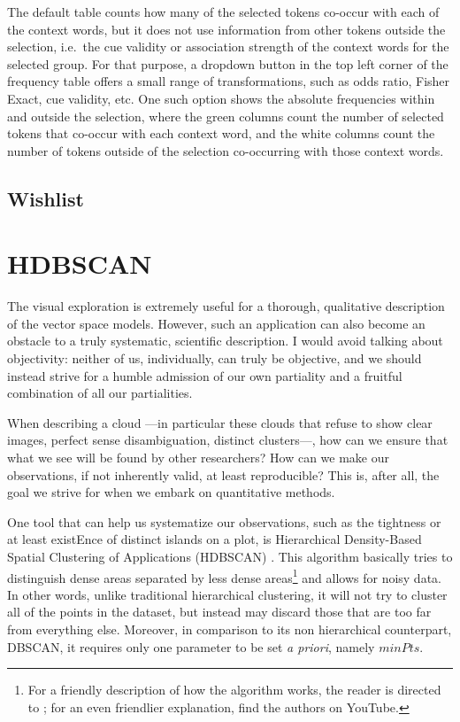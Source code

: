 \documentclass[
]{book}
\begin{document}
The default table counts how many of the selected tokens co-occur with each of the context words, but it does not use information from other tokens outside the selection, i.e.~the cue validity or association strength of the context words for the selected group. For that purpose, a dropdown button in the top left corner of the frequency table offers a small range of transformations, such as odds ratio, Fisher Exact, cue validity, etc. One such option shows the absolute frequencies within and outside the selection, where the green columns count the number of selected tokens that co-occur with each context word, and the white columns count the number of tokens outside of the selection co-occurring with those context words.

\hypertarget{wishlist}{%
\section{Wishlist}\label{wishlist}}

\hypertarget{hdbscan}{%
\chapter{HDBSCAN}\label{hdbscan}}

The visual exploration is extremely useful for a thorough, qualitative description
of the vector space models. However, such an application can also become an obstacle
to a truly systematic, scientific description. I would avoid talking about objectivity:
neither of us, individually, can truly be objective, and we should instead strive for a
humble admission of our own partiality and a fruitful combination of all our partialities.

When describing a cloud ---in particular these clouds that refuse to show clear images,
perfect sense disambiguation, distinct clusters---, how can we ensure that what we
see will be found by other researchers? How can we make our observations, if not
inherently valid, at least reproducible?
This is, after all, the goal we strive for when we embark on quantitative methods.

One tool that can help us systematize our observations, such as the tightness or at least
existEnce of distinct islands on a plot, is
Hierarchical Density-Based Spatial Clustering of Applications (HDBSCAN) \autocite{campello.etal_2013}.
This algorithm basically tries to distinguish dense areas separated by less dense areas\footnote{For a friendly description of how the algorithm works, the reader is directed to \textcite{mcinnes.etal_2016}; for an even friendlier explanation, find the authors on YouTube.}
and allows for noisy data. In other words, unlike traditional hierarchical clustering,
it will not try to cluster all of the points in the dataset, but instead may discard those
that are too far from everything else. Moreover, in comparison to its non hierarchical counterpart,
DBSCAN,
it requires only one parameter to be set \emph{a priori}, namely \(minPts\).
\end{document}
